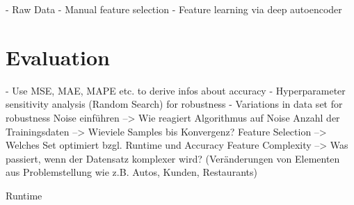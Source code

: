 - Raw Data 
- Manual feature selection
- Feature learning via deep autoencoder

\section{Evaluation} 
- Use MSE, MAE, MAPE etc. to derive infos about accuracy
- Hyperparameter sensitivity analysis (Random Search) for robustness
- Variations in data set for robustness
Noise einführen 
--> Wie reagiert Algorithmus auf Noise
Anzahl der Trainingsdaten 
--> Wieviele Samples bis Konvergenz?
Feature Selection
--> Welches Set optimiert bzgl. Runtime und Accuracy
Feature Complexity
--> Was passiert, wenn der Datensatz komplexer wird? (Veränderungen von Elementen aus Problemstellung wie z.B. Autos, Kunden, Restaurants)

Runtime